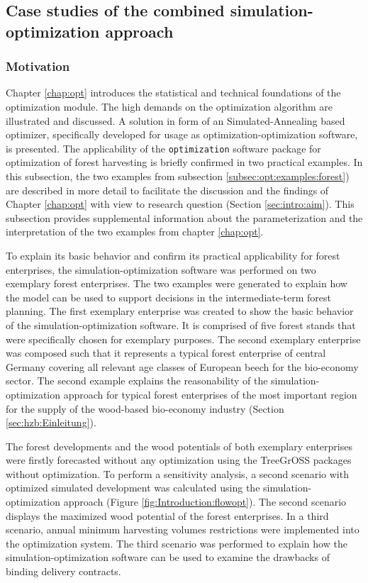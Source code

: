 \subsection{Case studies of the combined simulation-optimization approach}
\label{subsec:discussion:struct:opt:application}
\subsubsection{Motivation}
\label{subsubsec:discussion:struct:opt:application:introduction}
Chapter \ref{chap:opt} introduces the statistical and technical foundations of the optimization module. The high demands on the optimization algorithm are illustrated and discussed. A solution in form of an Simulated-Annealing based optimizer, specifically developed for usage as optimization-optimization software, is presented. The applicability of the \texttt{optimization} software package for optimization of forest harvesting is briefly confirmed in two practical examples. In this subsection, the two examples from subsection \ref{subsec:opt:examples:forest}) are described in more detail to facilitate the discussion and the findings of Chapter \ref{chap:opt} with view to research question (Section \ref{sec:intro:aim}). This subsection provides supplemental information about the parameterization and the interpretation of the two examples from chapter \ref{chap:opt}.

To explain its basic behavior and confirm its practical applicability for forest enterprises, the si\-mu\-la\-tion-op\-ti\-mi\-za\-tion software was performed on two exemplary forest enterprises. The two examples were generated to explain how the model can be used to support decisions in the intermediate-term forest planning. The first exemplary enterprise was created to show the basic behavior of the simulation-optimization software. It is comprised of five forest stands that were specifically chosen for exemplary purposes. The second exemplary enterprise was composed such that it represents a typical forest enterprise of central Germany covering all relevant age classes of European beech for the bio-economy sector. The second example explains the reasonability of the simulation-optimization approach for typical forest enterprises of the most important region for the supply of the wood-based bio-economy industry (Section \ref{sec:hzb:Einleitung}).

The forest developments and the wood potentials of both exemplary enterprises were firstly forecasted without any optimization using the TreeGrOSS packages without optimization. To perform a sensitivity analysis, a second scenario with optimized simulated development was calculated using the simulation-optimization approach (Figure \ref{fig:Introduction:flowopt}). The second scenario displays the maximized wood potential of the forest enterprises. In a third scenario, annual minimum harvesting volumes restrictions were implemented into the optimization system. The third scenario was performed to explain how the si\-mu\-la\-tion-op\-ti\-mi\-za\-tion software can be used to examine the drawbacks of binding delivery contracts.

